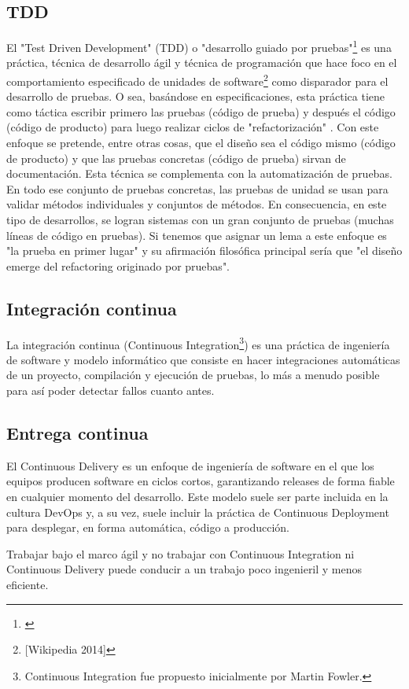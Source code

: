\subsection{TDD}

El "Test Driven Development" (TDD) o "desarrollo guiado por pruebas"\footnote{\cite{Jurado-2010}} es una práctica, técnica de desarrollo ágil y técnica de programación que hace foco en el comportamiento especificado de unidades de software\footnote{[Wikipedia 2014]} como disparador para el desarrollo de pruebas. O sea, basándose en especificaciones, esta práctica tiene como táctica escribir primero las pruebas (código de prueba) y después el código (código de producto) para luego realizar ciclos de "refactorización" \cite{Kent-Beck-2003}. Con este enfoque se pretende, entre otras cosas, que el diseño sea el código mismo (código de producto) y que las pruebas concretas (código de prueba) sirvan de documentación. Esta técnica se complementa con la automatización de pruebas. En todo ese conjunto de pruebas concretas, las pruebas de unidad se usan para validar métodos individuales y conjuntos de métodos. En consecuencia, en este tipo de desarrollos, se logran sistemas con un gran conjunto de pruebas (muchas líneas de código en pruebas).\newline
Si tenemos que asignar un lema a este enfoque es "la prueba en primer lugar" y su afirmación filosófica principal sería que "el diseño emerge del refactoring originado por pruebas".

\subsection{Integración continua}

La integración continua (Continuous Integration\footnote{Continuous Integration fue propuesto inicialmente por Martin Fowler.}) es una práctica de ingeniería de software y modelo informático que consiste en hacer integraciones automáticas de un proyecto, compilación y ejecución de pruebas, lo más a menudo posible para así poder detectar fallos cuanto antes.

\subsection{Entrega continua}

El Continuous Delivery es un enfoque de ingeniería de software en el que los equipos producen software en ciclos cortos, garantizando releases de forma fiable en cualquier momento del desarrollo. Este modelo suele ser parte incluida en la cultura DevOps y, a su vez, suele incluir la práctica de Continuous Deployment para desplegar, en forma automática, código a producción.

Trabajar bajo el marco ágil y no trabajar con Continuous Integration ni Continuous Delivery puede conducir a un trabajo poco ingenieril y menos eficiente.
